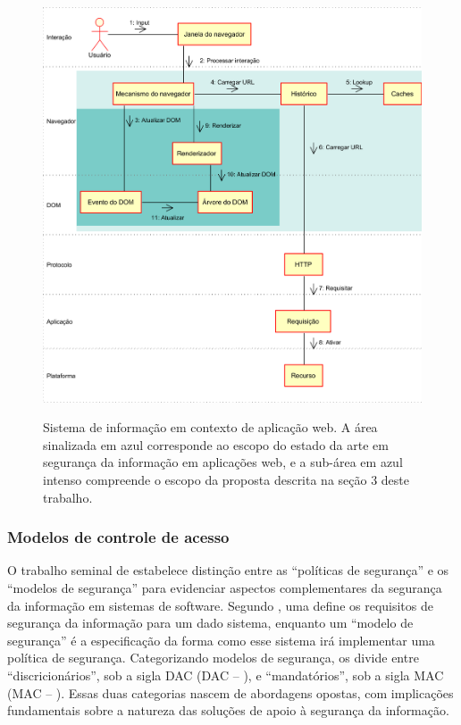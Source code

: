 \begin{figure}[h]
	\centering
	\includegraphics[width=12cm]{diagramas/escopo.png}
	\label{Fig: diagrama04}
	\caption[Sistema de informação em contexto de aplicação web]
	{Sistema de informação em contexto de aplicação web. A área sinalizada em azul corresponde ao escopo do estado da arte em segurança da informação em aplicações web, e a sub-área em azul intenso compreende o escopo da proposta descrita na seção 3 deste trabalho.}
\end{figure}


\subsubsection{Modelos de controle de acesso}
O trabalho seminal de  estabelece distinção entre as ``políticas de segurança'' e os ``modelos de segurança'' para evidenciar aspectos complementares da segurança da informação em sistemas de software. Segundo \citeauthor{Goguen1982}, uma  define os requisitos de segurança da informação para um dado sistema, enquanto um ``modelo de segurança'' é a especificação da forma como esse sistema irá implementar uma política de segurança. Categorizando modelos de segurança,  os divide entre ``discricionários'', sob a sigla DAC (DAC -- ), e ``mandatórios'', sob a sigla MAC (MAC -- ). Essas duas categorias nascem de abordagens opostas, com implicações fundamentais sobre a natureza das soluções de apoio à segurança da informação.

